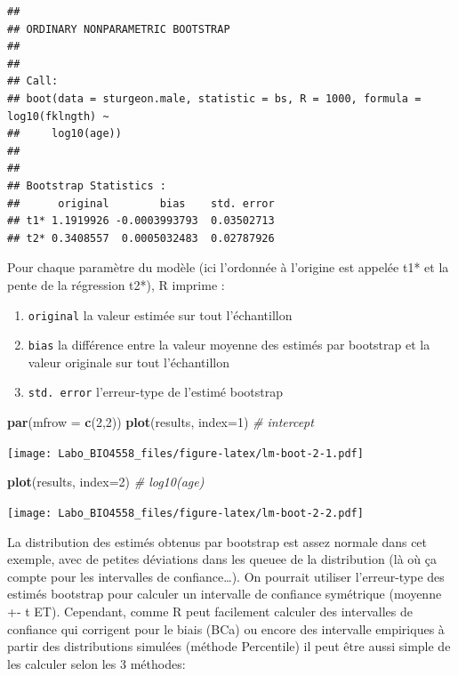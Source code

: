 \documentclass[12pt,]{book}
\newenvironment{Shaded}{\begin{snugshade}}{\end{snugshade}}
\newcommand{\CommentTok}[1]{\textcolor[rgb]{0.37,0.37,0.37}{\textit{#1}}}
\newcommand{\DataTypeTok}[1]{\textcolor[rgb]{0.27,0.27,0.27}{#1}}
\newcommand{\DecValTok}[1]{\textcolor[rgb]{0.06,0.06,0.06}{#1}}
\newcommand{\KeywordTok}[1]{\textcolor[rgb]{0.27,0.27,0.27}{\textbf{#1}}}
\newcommand{\NormalTok}[1]{#1}
\providecommand{\tightlist}{%
  \setlength{\itemsep}{0pt}\setlength{\parskip}{0pt}}
\begin{document}
\begin{verbatim}
## 
## ORDINARY NONPARAMETRIC BOOTSTRAP
## 
## 
## Call:
## boot(data = sturgeon.male, statistic = bs, R = 1000, formula = log10(fklngth) ~ 
##     log10(age))
## 
## 
## Bootstrap Statistics :
##      original        bias    std. error
## t1* 1.1919926 -0.0003993793  0.03502713
## t2* 0.3408557  0.0005032483  0.02787926
\end{verbatim}

Pour chaque paramètre du modèle (ici l'ordonnée à l'origine est
appelée t1* et la pente de la régression t2*), R imprime :

\begin{enumerate}
\def\labelenumi{\arabic{enumi}.}
\tightlist
\item
  \texttt{original} la valeur estimée sur tout l'échantillon
\item
  \texttt{bias} la différence entre la valeur moyenne des estimés par bootstrap et la valeur originale sur tout l'échantillon
\item
  \texttt{std.\ error} l'erreur-type de l'estimé bootstrap
\end{enumerate}

\begin{Shaded}
\begin{Highlighting}[]
\KeywordTok{par}\NormalTok{(}\DataTypeTok{mfrow =} \KeywordTok{c}\NormalTok{(}\DecValTok{2}\NormalTok{,}\DecValTok{2}\NormalTok{))}
\KeywordTok{plot}\NormalTok{(results, }\DataTypeTok{index=}\DecValTok{1}\NormalTok{) }\CommentTok{# intercept}
\end{Highlighting}
\end{Shaded}

\texttt{[image: Labo\_BIO4558\_files/figure-latex/lm-boot-2-1.pdf]}

\begin{Shaded}
\begin{Highlighting}[]
\KeywordTok{plot}\NormalTok{(results, }\DataTypeTok{index=}\DecValTok{2}\NormalTok{) }\CommentTok{# log10(age)}
\end{Highlighting}
\end{Shaded}

\texttt{[image: Labo\_BIO4558\_files/figure-latex/lm-boot-2-2.pdf]}

La distribution des estimés obtenus par bootstrap est assez normale dans cet exemple, avec de petites déviations dans les queuee de la distribution (là où ça compte pour les intervalles de confiance\ldots{}). On pourrait utiliser l'erreur-type des estimés bootstrap pour calculer un intervalle de confiance symétrique (moyenne +- t ET). Cependant, comme R peut facilement calculer des intervalles de confiance qui corrigent pour le biais (BCa) ou encore des intervalle empiriques à partir des distributions simulées (méthode Percentile) il peut être aussi simple de les calculer selon les 3 méthodes:
\end{document}
